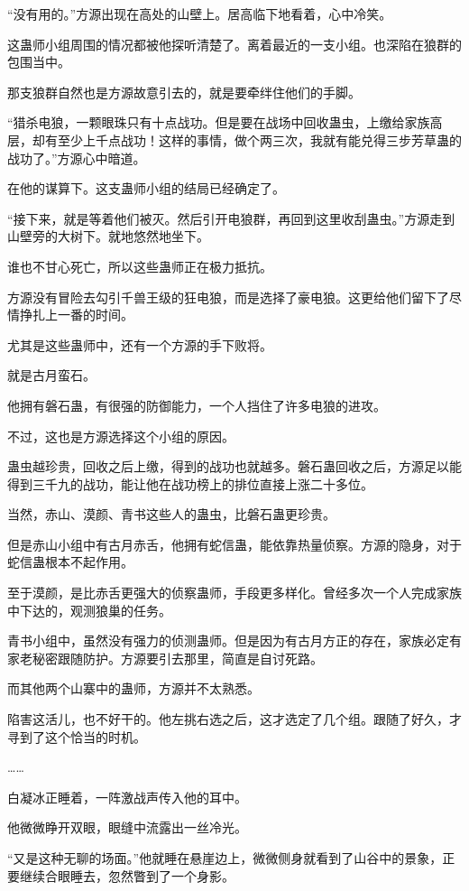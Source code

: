 \begin{this_body}
“没有用的。”方源出现在高处的山壁上。居高临下地看着，心中冷笑。

这蛊师小组周围的情况都被他探听清楚了。离着最近的一支小组。也深陷在狼群的包围当中。

那支狼群自然也是方源故意引去的，就是要牵绊住他们的手脚。

“猎杀电狼，一颗眼珠只有十点战功。但是要在战场中回收蛊虫，上缴给家族高层，却有至少上千点战功！这样的事情，做个两三次，我就有能兑得三步芳草蛊的战功了。”方源心中暗道。

在他的谋算下。这支蛊师小组的结局已经确定了。

“接下来，就是等着他们被灭。然后引开电狼群，再回到这里收刮蛊虫。”方源走到山壁旁的大树下。就地悠然地坐下。

谁也不甘心死亡，所以这些蛊师正在极力抵抗。

方源没有冒险去勾引千兽王级的狂电狼，而是选择了豪电狼。这更给他们留下了尽情挣扎上一番的时间。

尤其是这些蛊师中，还有一个方源的手下败将。

就是古月蛮石。

他拥有磐石蛊，有很强的防御能力，一个人挡住了许多电狼的进攻。

不过，这也是方源选择这个小组的原因。

蛊虫越珍贵，回收之后上缴，得到的战功也就越多。磐石蛊回收之后，方源足以能得到三千九的战功，能让他在战功榜上的排位直接上涨二十多位。

当然，赤山、漠颜、青书这些人的蛊虫，比磐石蛊更珍贵。

但是赤山小组中有古月赤舌，他拥有蛇信蛊，能依靠热量侦察。方源的隐身，对于蛇信蛊根本不起作用。

至于漠颜，是比赤舌更强大的侦察蛊师，手段更多样化。曾经多次一个人完成家族中下达的，观测狼巢的任务。

青书小组中，虽然没有强力的侦测蛊师。但是因为有古月方正的存在，家族必定有家老秘密跟随防护。方源要引去那里，简直是自讨死路。

而其他两个山寨中的蛊师，方源并不太熟悉。

陷害这活儿，也不好干的。他左挑右选之后，这才选定了几个组。跟随了好久，才寻到了这个恰当的时机。

……

白凝冰正睡着，一阵激战声传入他的耳中。

他微微睁开双眼，眼缝中流露出一丝冷光。

“又是这种无聊的场面。”他就睡在悬崖边上，微微侧身就看到了山谷中的景象，正要继续合眼睡去，忽然瞥到了一个身影。


\end{this_body}

